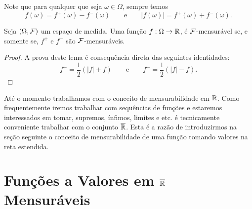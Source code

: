 Note que para qualquer que seja $\omega\in\Omega$, sempre temos
	\[
		f(\omega) = f^+(\omega)-f^{-}(\omega)
		\qquad
		\text{e}
		\qquad
		|f(\omega)| = f^+(\omega)+f^{-}(\omega).
	\]
	
	
\begin{lema}
	Seja $(\Omega,\mathcal{F})$ um espaço de medida. Uma função 
	$f:\Omega\to\mathbb{R}$, é $\mathcal{F}$-mensurável se, e somente se,
	$f^+$ e $f^-$ são $\mathcal{F}$-mensuráveis.
\end{lema}

\begin{proof}
A prova deste lema é consequência direta das seguintes identidades:
\[
	f^{+} = \frac{1}{2}(|f|+f)
	\qquad
	\text{e}
	\qquad
	f^{-} = \frac{1}{2}(|f|-f).
\]
\end{proof}


Até o momento trabalhamos com o conceito de mensurabilidade em 
$\mathbb{R}$. Como frequentemente iremos trabalhar com sequências de 
funções e estaremos interessados em tomar, supremos, ínfimos,
limites e etc. é tecnicamente conveniente trabalhar com o 
conjunto $\overline{\mathbb{R}}$. Esta é a razão de introduzirmos 
na seção seguinte o conceito de mensurabilidade de uma função 
tomando valores na reta estendida. 






\section{Funções a Valores em $\overline{\mathbb{R}}$ Mensuráveis}